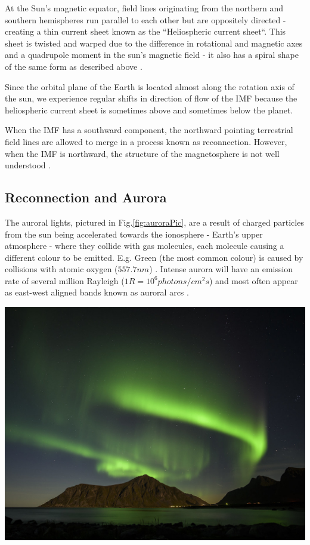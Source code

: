\documentclass[12pt]{article}
\newenvironment{Figure}
  {\par\medskip\noindent\minipage{\linewidth}}
  {\endminipage\par\medskip}
\begin{document}
At the Sun's magnetic equator, field lines originating from the northern and southern hemispheres run parallel to each other but are oppositely directed - creating a thin current sheet known as the ``Heliospheric current sheet``. This sheet is twisted and warped due to the difference in rotational and magnetic axes and a quadrupole moment in the sun's magnetic field - it also has a spiral shape of the same form as described above \cite{alfven_1942, ParkerSpiral}.

Since the orbital plane of the Earth is located almost along the rotation axis of the sun, we experience regular shifts in direction of flow of the IMF because the heliospheric current sheet is sometimes above and sometimes below the planet. 

When the IMF has a southward component, the northward pointing terrestrial field lines are allowed to merge in a process known as reconnection. However, when the IMF is northward, the structure of the magnetosphere is not well understood \cite{Fear1506}.

\subsection{Reconnection and Aurora}
The auroral lights, pictured in Fig.\ref{fig:auroraPic}, are a result of charged particles from the sun being accelerated towards the ionosphere - Earth's upper atmosphere - where they collide with gas molecules, each molecule causing a different colour to be emitted. 
E.g. Green (the most common colour) is caused by collisions with atomic oxygen ($557.7 nm$) \cite{hollier, BSPP}. Intense aurora will have an emission rate of several million Rayleigh ($1R=10^6 photons/cm^2s$) and most often appear as east-west aligned bands known as auroral arcs \cite{BSPP}.

\begin{Figure}
    \begin{minipage}[c]{0.67\textwidth}
        \centering
        \includegraphics[width=0.8\linewidth]{nothernLights.jpg}
    \end{minipage}
    \begin{minipage}[c]{0.3\textwidth}
        \label{fig:auroraPic}
    \end{minipage}
\end{Figure}
\end{document}
